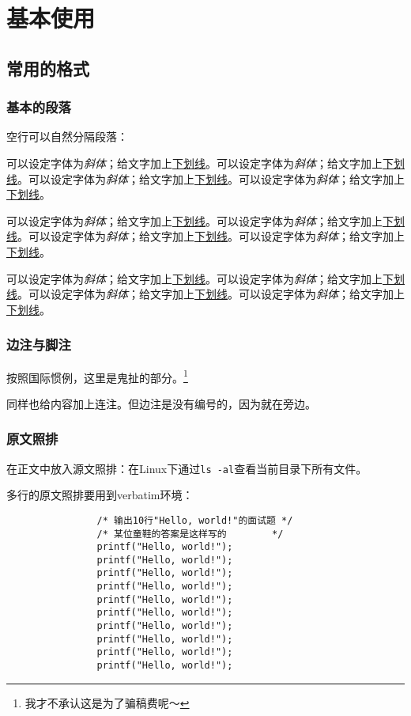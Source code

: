 \chapter{基本使用}

	\section{常用的格式}

		\subsection{基本的段落}
			空行可以自然分隔段落：

			可以设定字体为\textit{斜体}；给文字加上\underline{下划线}。可以设定字体为\textit{斜体}；给文字加上\underline{下划线}。可以设定字体为\textit{斜体}；给文字加上\underline{下划线}。可以设定字体为\textit{斜体}；给文字加上\underline{下划线}。

			可以设定字体为\textit{斜体}；给文字加上\underline{下划线}。可以设定字体为\textit{斜体}；给文字加上\underline{下划线}。可以设定字体为\textit{斜体}；给文字加上\underline{下划线}。可以设定字体为\textit{斜体}；给文字加上\underline{下划线}。

			可以设定字体为\textit{斜体}；给文字加上\underline{下划线}。可以设定字体为\textit{斜体}；给文字加上\underline{下划线}。可以设定字体为\textit{斜体}；给文字加上\underline{下划线}。可以设定字体为\textit{斜体}；给文字加上\underline{下划线}。

		\subsection{边注与脚注}
			按照国际惯例，这里是鬼扯的部分。\footnote{我才不承认这是为了骗稿费呢～}

			同样也给内容加上连注。但边注是没有编号的，因为就在旁边。

		\subsection{原文照排}
			在正文中放入源文照排：在Linux下通过\verb|ls -al|查看当前目录下所有文件。

			多行的原文照排要用到verbatim环境：
			\begin{verbatim}
				/* 输出10行"Hello, world!"的面试题 */
				/* 某位童鞋的答案是这样写的        */
				printf("Hello, world!");
				printf("Hello, world!");
				printf("Hello, world!");
				printf("Hello, world!");
				printf("Hello, world!");
				printf("Hello, world!");
				printf("Hello, world!");
				printf("Hello, world!");
				printf("Hello, world!");
				printf("Hello, world!");
			\end{verbatim}

